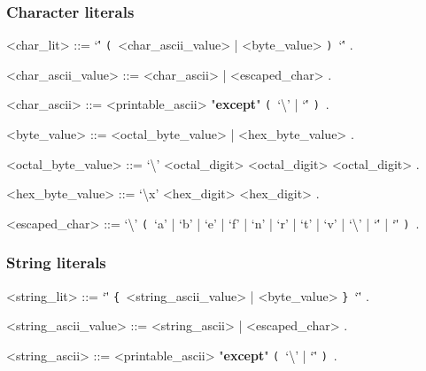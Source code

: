 \documentclass{article}
\def\lrep{\synshortsoff\texttt{\{}\synshorts~}
\def\rrep{\synshortsoff\texttt{\}}\synshorts~}
\def\lgrp{\synshortsoff\texttt{(}\synshorts~}
\def\rgrp{\synshortsoff\texttt{)}\synshorts~}
\begin{document}
\subsubsection*{Character literals}
\begin{grammar}
  <char_lit> ::= `\'' \lgrp <char_ascii_value> | <byte_value> \rgrp `\'' .

  <char_ascii_value> ::= <char_ascii> | <escaped_char> .

  <char_ascii> ::= <printable_ascii> "\textbf{except}" \lgrp `\textbackslash' | `\'' \rgrp .

  <byte_value> ::= <octal_byte_value> | <hex_byte_value> .

  <octal_byte_value> ::= `\textbackslash' <octal_digit> <octal_digit> <octal_digit> .

  <hex_byte_value> ::= `\textbackslash x' <hex_digit> <hex_digit> .

  <escaped_char> ::= `\textbackslash' \lgrp `a' | `b' | `e' | `f' | `n' | `r' | `t' | `v' | `\textbackslash' | `\'' | `\"' \rgrp .
\end{grammar}

\subsubsection*{String literals}
\begin{grammar}
  <string_lit> ::= `\"' \lrep <string_ascii_value> | <byte_value> \rrep `\"' .

  <string_ascii_value> ::= <string_ascii> | <escaped_char> .

  <string_ascii> ::= <printable_ascii> "\textbf{except}" \lgrp `\textbackslash' | `\"' \rgrp .
\end{grammar}
\end{document}
